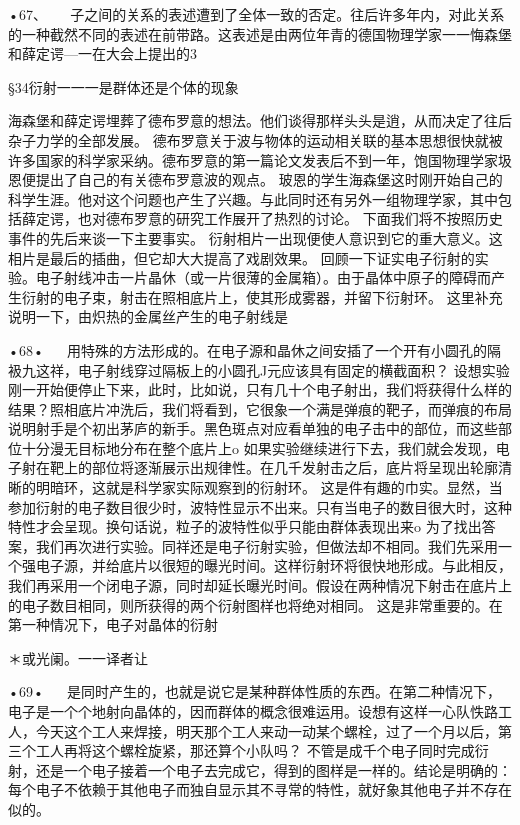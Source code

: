 •67、
  
子之间的关系的表述遭到了全体一致的否定。往后许多年内，对此关系的一种截然不同的表述在前带路。这表述是由两位年青的德国物理学家一一悔森堡和薛定谔—一在大会上提出的3

§34衍射一一一是群体还是个体的现象

海森堡和薛定谔埋葬了德布罗意的想法。他们谈得那样头头是逍，从而决定了往后杂子力学的全部发展。
德布罗意关于波与物体的运动相关联的基本思想很快就被许多国家的科学家采纳。德布罗意的第一篇论文发表后不到一年，饱国物理学家圾恩便提出了自己的有关德布罗意波的观点。
玻恩的学生海森堡这时刚开始自己的科学生涯。他对这个问题也产生了兴趣。与此同时还有另外一组物理学家，其中包括薛定谔，也对德布罗意的研究工作展开了热烈的讨论。
下面我们将不按照历史事件的先后来谈一下主要事实。
衍射相片一出现便使人意识到它的重大意义。这相片是最后的插曲，但它却大大提高了戏剧效果。
回顾一下证实电子衍射的实验。电子射线冲击一片晶休（或一片很薄的金属箱）。由于晶体中原子的障碍而产生衍射的电子束，射击在照相底片上，使其形成雾器，并留下衍射环。
这里补充说明一下，由炽热的金属丝产生的电子射线是

•68•
  
用特殊的方法形成的。在电子源和晶休之间安插了一个开有小圆孔的隔衱九这祥，电子射线穿过隔板上的小圆孔J元应该具有固定的横截面积？
设想实验刚一开始便停止下来，此时，比如说，只有几十个电子射出，我们将获得什么样的结果？照相底片冲洗后，我们将看到，它很象一个满是弹痕的靶子，而弹痕的布局说明射手是个初出茅庐的新手。黑色斑点对应看单独的电子击中的部位，而这些部位十分漫无目标地分布在整个底片上o
如果实验继续进行下去，我们就会发现，电子射在靶上的部位将逐渐展示出规律性。在几千发射击之后，底片将呈现出轮廓清晰的明暗环，这就是科学家实际观察到的衍射环。
这是件有趣的巾实。显然，当参加衍射的电子数目很少时，波特性显示不出来。只有当电子的数目很大时，这种特性才会呈现。换句话说，粒子的波特性似乎只能由群体表现出来o
为了找出答案，我们再次进行实验。同祥还是电子衍射实验，但做法却不相同。我们先采用一个强电子源，并给底片以很短的曝光时间。这样衍射环将很快地形成。与此相反，我们再采用一个闭电子源，同时却延长曝光时间。假设在两种情况下射击在底片上的电子数目相同，则所获得的两个衍射图样也将绝对相同。
这是非常重要的。在第一种情况下，电子对晶体的衍射

＊或光阑。一一译者让

•69•
  
是同时产生的，也就是说它是某种群体性质的东西。在第二种情况下，电子是一个个地射向晶体的，因而群体的概念很难运用。设想有这样一心队怢路工人，今天这个工人来焊接，明天那个工人来动一动某个螺栓，过了一个月以后，第三个工人再将这个螺栓旋紧，那还算个小队吗？
不管是成千个电子同时完成衍射，还是一个电子接着一个电子去完成它，得到的图样是一样的。结论是明确的：每个电子不依赖于其他电子而独自显示其不寻常的特性，就好象其他电子并不存在似的。

